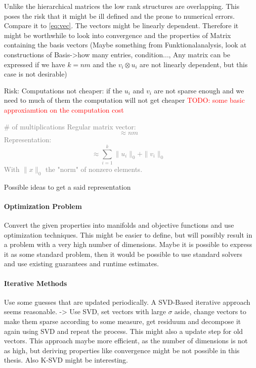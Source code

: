 \documentclass[lang=ngerman,inputenc=utf8,fontsize=10pt]{ldvarticle}
\begin{document}
Unlike the hierarchical matrices the low rank structures are overlapping. 
This poses the risk that it might be ill defined and the prone to numerical errors. Compare it to \eqref{eq:vec}. The vectors might be linearly dependent. 
Therefore it might be worthwhile to look into convergence and the properties of Matrix containing the basis vectors (Maybe something from Funktionalanalysis, look at constructions of Basis->how many entries, condition..., Any matrix can be expressed if we have $k=nm$ and the $v_i\otimes u_i$ are not linearly dependent, but this case is not desirable)





Risk:
Computations not cheaper: 
if the $u_i$ and $v_i$ are not sparse enough and we need to much of them the computation will not get cheaper
\textcolor{red}{TODO: some basic approxiamtion on the computation cost}

\textcolor{gray}{
\# of multiplications
Regular matrix vector: 
$$\approx nm$$
Representation:
$$\approx \sum_{i=1}^k \|u_i\|_0+\|v_i\|_0$$
With $\|x\|_0$ the "norm" of nonzero elements.}

Possible ideas to get a said representation

\paragraph{Optimization Problem}
Convert the given properties into manifolds and objective functions and use optimization techniques.
This might be easier to define, but will possibly result in a problem with a very high number of dimensions. Maybe it is possible to express it as some standard problem, then it would be possible to use standard solvers and use existing guarantees and runtime estimates.

\paragraph{Iterative Methods}
Use some guesses that are updated periodically.
A SVD-Based iterative approach seems reasonable.
-> Use SVD, set vectors with large $\sigma$ aside, change vectors to make them sparse according to some measure, get residuum and decompose it again using SVD and repeat the process. This might also a update step for old vectors.
This approach maybe more efficient, as the number of dimensions is not as high, but deriving properties like convergence might be not possible in this thesis.
Also K-SVD might be interesting.
\end{document}
